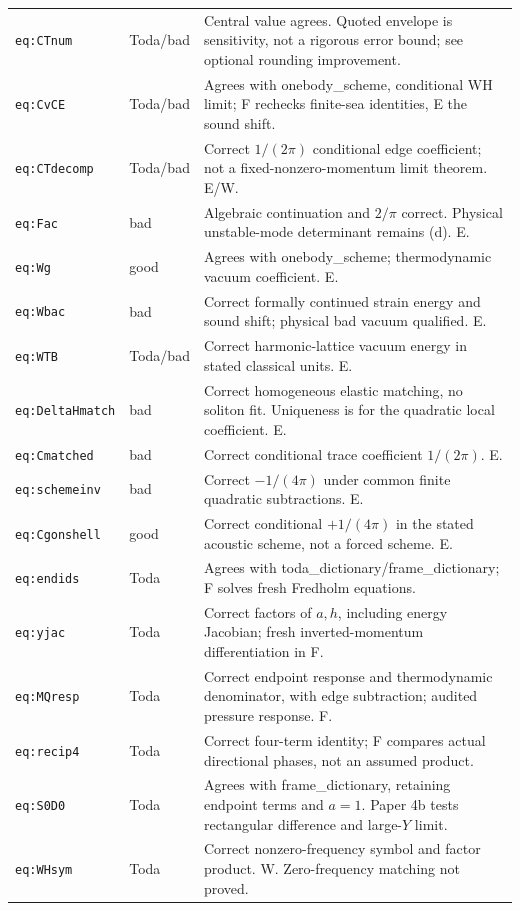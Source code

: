 \documentclass[11pt,a4paper]{article}
\newcommand{\file}[1]{\nolinkurl{#1}}
\begin{document}
\begin{longtable}{@{}L{3.0cm}L{1.6cm}L{10.6cm}@{}}
\file{eq:CTnum} & Toda/bad & Central value agrees. Quoted envelope is sensitivity, not a rigorous error bound; see optional rounding improvement.\\
\file{eq:CvCE} & Toda/bad & Agrees with onebody\_scheme, conditional WH limit; F rechecks finite-sea identities, E the sound shift.\\
\file{eq:CTdecomp} & Toda/bad & Correct $1/(2\pi)$ conditional edge coefficient; not a fixed-nonzero-momentum limit theorem. E/W.\\
\file{eq:Fac} & bad & Algebraic continuation and $2/\pi$ correct. Physical unstable-mode determinant remains (d). E.\\
\file{eq:Wg} & good & Agrees with onebody\_scheme; thermodynamic vacuum coefficient. E.\\
\file{eq:Wbac} & bad & Correct formally continued strain energy and sound shift; physical bad vacuum qualified. E.\\
\file{eq:WTB} & Toda/bad & Correct harmonic-lattice vacuum energy in stated classical units. E.\\
\file{eq:DeltaHmatch} & bad & Correct homogeneous elastic matching, no soliton fit. Uniqueness is for the quadratic local coefficient. E.\\
\file{eq:Cmatched} & bad & Correct conditional trace coefficient $1/(2\pi)$. E.\\
\file{eq:schemeinv} & bad & Correct $-1/(4\pi)$ under common finite quadratic subtractions. E.\\
\file{eq:Cgonshell} & good & Correct conditional $+1/(4\pi)$ in the stated acoustic scheme, not a forced scheme. E.\\
\file{eq:endids} & Toda & Agrees with toda\_dictionary/frame\_dictionary; F solves fresh Fredholm equations.\\
\file{eq:yjac} & Toda & Correct factors of $a,h$, including energy Jacobian; fresh inverted-momentum differentiation in F.\\
\file{eq:MQresp} & Toda & Correct endpoint response and thermodynamic denominator, with edge subtraction; audited pressure response. F.\\
\file{eq:recip4} & Toda & Correct four-term identity; F compares actual directional phases, not an assumed product.\\
\file{eq:S0D0} & Toda & Agrees with frame\_dictionary, retaining endpoint terms and $a=1$. Paper 4b tests rectangular difference and large-$Y$ limit.\\
\file{eq:WHsym} & Toda & Correct nonzero-frequency symbol and factor product. W. Zero-frequency matching not proved.\\

\end{longtable}
\end{document}
